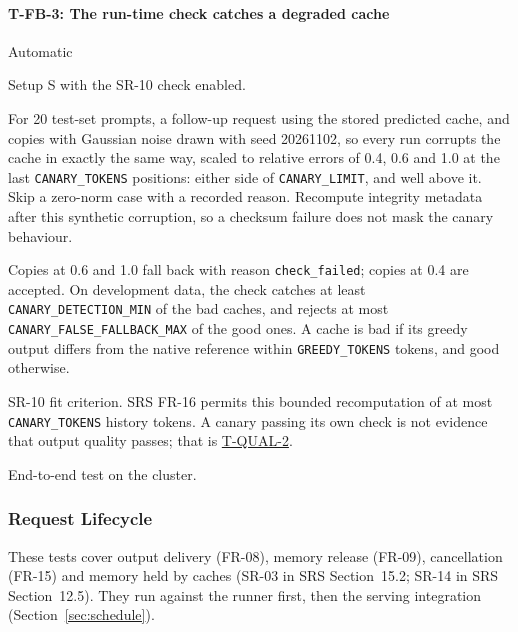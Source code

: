 \documentclass[12pt, titlepage]{article}
\newenvironment{testcase}[2]
  {\Needspace{8\baselineskip}\paragraph{#1: #2}\phantomsection\label{test:#1}\sloppy
   \begin{description}[style=sameline, leftmargin=3.6cm, labelwidth=3.4cm,
     font=\normalfont\bfseries, itemsep=2pt, topsep=2pt]}
  {\end{description}}
\newcommand{\cst}[1]{\texttt{#1}}
\newcommand{\tref}[1]{\hyperref[test:#1]{#1}}
\begin{document}
\begin{testcase}{T-FB-3}{The run-time check catches a degraded cache}
\item[Control] Automatic
\item[Initial state] Setup S with the SR-10 check enabled.
\item[Input] For 20 test-set prompts, a follow-up request using the
stored predicted cache, and copies with Gaussian noise drawn with seed 20261102, so every run corrupts
the cache in exactly the same way,
scaled to relative errors of 0.4, 0.6 and 1.0 at the last
\cst{CANARY\_TOKENS} positions: either side of \cst{CANARY\_LIMIT}, and
well above it. Skip a zero-norm case with a recorded
reason. Recompute integrity metadata after this synthetic corruption,
so a checksum failure does not mask the canary behaviour.
\item[Output] Copies at 0.6 and 1.0 fall back with reason
\texttt{check\_failed}; copies at 0.4 are accepted. On development data,
the check catches at least \cst{CANARY\_DETECTION\_MIN} of the bad caches,
and rejects at most \cst{CANARY\_FALSE\_FALLBACK\_MAX} of the good ones. A
cache is bad if its greedy output differs from the native reference within
\cst{GREEDY\_TOKENS} tokens, and good otherwise.
\item[Derivation] SR-10 fit criterion. SRS FR-16 permits this bounded
recomputation of at most \cst{CANARY\_TOKENS} history tokens. A canary passing
its own check is not evidence that output quality passes; that is
\tref{T-QUAL-2}.
\item[How performed] End-to-end test on the cluster.
\end{testcase}

\subsubsection{Request Lifecycle}

These tests cover output delivery (FR-08), memory release (FR-09),
cancellation (FR-15) and memory held by caches (SR-03 in SRS
Section~15.2; SR-14 in SRS Section~12.5). They run against the runner first,
then the serving integration (Section~\ref{sec:schedule}).
\end{document}
